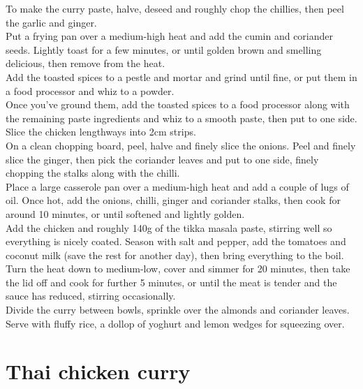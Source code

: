 \documentclass{tufte-book}
\begin{document}
\smallskip
To make the curry paste, halve, deseed and roughly chop the chillies, then peel the garlic and ginger. 
\\Put a frying pan over a medium-high heat and add the cumin and coriander seeds. Lightly toast for a few minutes, or until golden brown and smelling delicious, then remove from the heat. 
\\Add the toasted spices to a pestle and mortar and grind until fine, or put them in a food processor and whiz to a powder. 
\\Once you've ground them, add the toasted spices to a food processor along with the remaining paste ingredients and whiz to a smooth paste, then put to one side.
\\Slice the chicken lengthways into 2cm strips. 
\\On a clean chopping board, peel, halve and finely slice the onions. Peel and finely slice the ginger, then pick the coriander leaves and put to one side, finely chopping the stalks along with the chilli.
\\Place a large casserole pan over a medium-high heat and add a couple of lugs of oil. Once hot, add the onions, chilli, ginger and coriander stalks, then cook for around 10 minutes, or until softened and lightly golden. 
\\Add the chicken and roughly 140g of the tikka masala paste, stirring well so everything is nicely coated. Season with salt and pepper, add the tomatoes and coconut milk (save the rest for another day), then bring everything to the boil.
\\Turn the heat down to medium-low, cover and simmer for 20 minutes, then take the lid off and cook for further 5 minutes, or until the meat is tender and the sauce has reduced, stirring occasionally. 
\\Divide the curry between bowls, sprinkle over the almonds and coriander leaves. Serve with fluffy rice, a dollop of yoghurt and lemon wedges for squeezing over.

\newpage

\section{Thai chicken curry}
\end{document}
